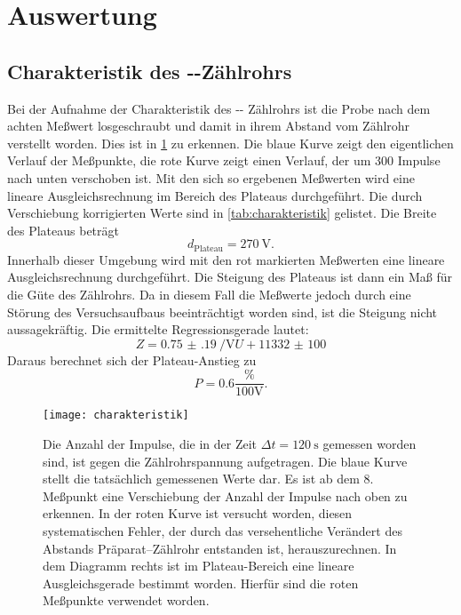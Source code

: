 
\section{Auswertung}

\subsection{Charakteristik des --Zählrohrs}

Bei der Aufnahme der Charakteristik des --
Zählrohrs ist die Probe nach dem achten Meßwert losgeschraubt und damit
in ihrem Abstand vom Zählrohr verstellt worden. Dies ist in
\cref{fig:charakteristik} zu erkennen. Die blaue Kurve zeigt den
eigentlichen Verlauf der Meßpunkte, die rote Kurve zeigt einen Verlauf,
der um 300 Impulse nach unten verschoben ist. Mit den sich so ergebenen
Meßwerten wird eine lineare Ausgleichsrechnung im Bereich des Plateaus
durchgeführt. Die durch Verschiebung korrigierten Werte sind in
\cref{tab:charakteristik} gelistet. Die Breite des Plateaus beträgt
%
\begin{equation}
  d_\text{Plateau} = \SI{270}{\volt}.
\end{equation}
%
Innerhalb dieser Umgebung wird mit den rot markierten Meßwerten eine
lineare Ausgleichsrechnung durchgeführt. Die Steigung des Plateaus ist
dann ein Maß für die Güte des Zählrohrs. Da in diesem Fall die Meßwerte
jedoch durch eine Störung des Versuchsaufbaus beeinträchtigt worden
sind, ist die Steigung nicht aussagekräftig. Die ermittelte
Regressionsgerade lautet:
%
\begin{equation}
  Z = \SI{0.75(19)}{\per\volt} U + \num{11332(100)}
\end{equation}
Daraus berechnet sich der Plateau-Anstieg zu
\begin{equation}
  P = \num{0.6} \frac{\%}{100 \mathrm{V}}.
\end{equation}

\begin{figure}
  \centering
  \texttt{[image: charakteristik]}
  \caption{Die Anzahl der Impulse, die in der Zeit $\Delta t =
    \SI{120}{\second}$ gemessen worden sind, ist gegen die
    Zählrohrspannung aufgetragen. Die blaue Kurve stellt die tatsächlich
    gemessenen Werte dar. Es ist ab dem 8. Meßpunkt eine Verschiebung
    der Anzahl der Impulse nach oben zu erkennen. In der roten Kurve ist
    versucht worden, diesen systematischen Fehler, der durch das
    versehentliche Verändert des Abstands Präparat--Zählrohr entstanden
    ist, herauszurechnen. In dem Diagramm rechts ist im Plateau-Bereich
    eine lineare Ausgleichsgerade bestimmt worden. Hierfür sind die
    roten Meßpunkte verwendet worden.}
  \label{fig:charakteristik}
\end{figure}

